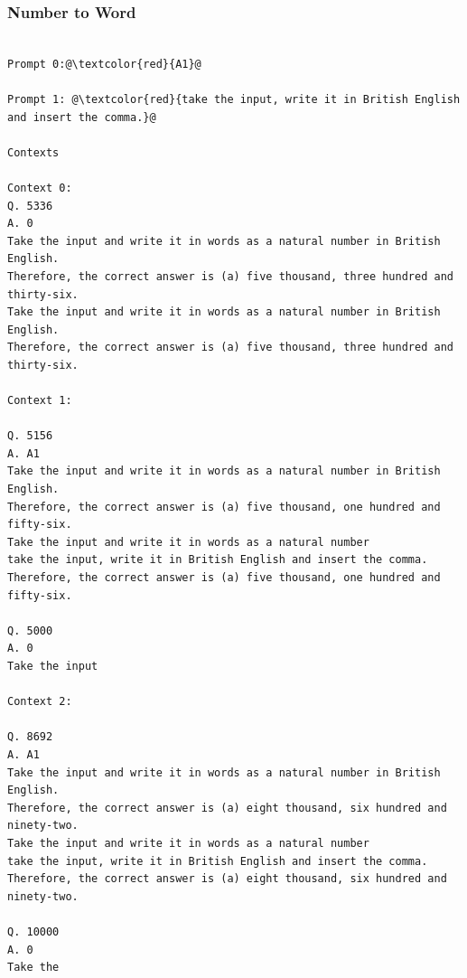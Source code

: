 \documentclass{article} %
\begin{document}
\subsubsection{Number to Word}
\begin{tcolorbox}
\begin{lstlisting}[escapechar=@]

Prompt 0:@\textcolor{red}{A1}@

Prompt 1: @\textcolor{red}{take the input, write it in British English and insert the comma.}@

Contexts

Context 0:
Q. 5336
A. 0
Take the input and write it in words as a natural number in British English.
Therefore, the correct answer is (a) five thousand, three hundred and thirty-six.
Take the input and write it in words as a natural number in British English.
Therefore, the correct answer is (a) five thousand, three hundred and thirty-six.

Context 1:

Q. 5156
A. A1
Take the input and write it in words as a natural number in British English.
Therefore, the correct answer is (a) five thousand, one hundred and fifty-six.
Take the input and write it in words as a natural number
take the input, write it in British English and insert the comma.
Therefore, the correct answer is (a) five thousand, one hundred and fifty-six.

Q. 5000
A. 0
Take the input

Context 2:

Q. 8692
A. A1
Take the input and write it in words as a natural number in British English.
Therefore, the correct answer is (a) eight thousand, six hundred and ninety-two.
Take the input and write it in words as a natural number
take the input, write it in British English and insert the comma.
Therefore, the correct answer is (a) eight thousand, six hundred and ninety-two.

Q. 10000
A. 0
Take the
\end{lstlisting}
\end{tcolorbox}
\end{document}
